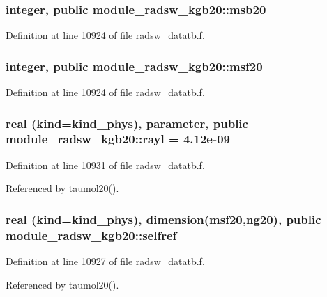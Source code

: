 \subsubsection[{\texorpdfstring{msb20}{msb20}}]{\setlength{\rightskip}{0pt plus 5cm}integer, public module\+\_\+radsw\+\_\+kgb20\+::msb20}\hypertarget{namespacemodule__radsw__kgb20_a385f5b8c61ed1de7aa3bbb6bd65f522f}{}\label{namespacemodule__radsw__kgb20_a385f5b8c61ed1de7aa3bbb6bd65f522f}


Definition at line 10924 of file radsw\+\_\+datatb.\+f.

\subsubsection[{\texorpdfstring{msf20}{msf20}}]{\setlength{\rightskip}{0pt plus 5cm}integer, public module\+\_\+radsw\+\_\+kgb20\+::msf20}\hypertarget{namespacemodule__radsw__kgb20_a925dc2da02eef4edcf000a14525a7c7e}{}\label{namespacemodule__radsw__kgb20_a925dc2da02eef4edcf000a14525a7c7e}


Definition at line 10924 of file radsw\+\_\+datatb.\+f.

\subsubsection[{\texorpdfstring{rayl}{rayl}}]{\setlength{\rightskip}{0pt plus 5cm}real (kind=kind\+\_\+phys), parameter, public module\+\_\+radsw\+\_\+kgb20\+::rayl = 4.\+12e-\/09}\hypertarget{namespacemodule__radsw__kgb20_a6a00db6ce81c299d44ef5eadc1fe3b5b}{}\label{namespacemodule__radsw__kgb20_a6a00db6ce81c299d44ef5eadc1fe3b5b}


Definition at line 10931 of file radsw\+\_\+datatb.\+f.



Referenced by taumol20().

\subsubsection[{\texorpdfstring{selfref}{selfref}}]{\setlength{\rightskip}{0pt plus 5cm}real (kind=kind\+\_\+phys), dimension({\bf msf20},ng20), public module\+\_\+radsw\+\_\+kgb20\+::selfref}\hypertarget{namespacemodule__radsw__kgb20_aa3853af5e29277f9ed2bdd397cab5029}{}\label{namespacemodule__radsw__kgb20_aa3853af5e29277f9ed2bdd397cab5029}


Definition at line 10927 of file radsw\+\_\+datatb.\+f.



Referenced by taumol20().

